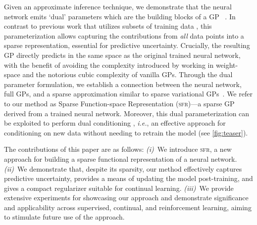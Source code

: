 \documentclass{article}
\makeatletter
\newcommand{\ie}{\textit{i.e.\@}\xspace}
\newcommand{\our}{\textsc{sfr}\xspace}
\makeatother
\begin{document}
Given an approximate inference technique, we demonstrate that the neural network emits `dual' parameters which are the building blocks of a GP~\cite{csato2002sparse, adam2021dual, chang2020fast} . In contrast to previous work that utilizes subsets of training data \cite{immer2021scalable},
this parameterization allows capturing the contributions from {\em all} data points into a sparse representation, essential for predictive uncertainty. Crucially, the resulting GP directly predicts in the same space as the original trained neural network, with the benefit of avoiding the complexity introduced by working in weight-space and the notorious cubic complexity of vanilla GPs.
Through the dual parameter formulation, we establish a connection between the neural network, full GPs, and a sparse approximation similar to sparse variational GPs~\cite{titsias2009variational}. We refer to our method as Sparse Function-space Representation (\our)---a sparse GP derived from a trained neural network. Moreover, this dual parameterization can be exploited to perform dual conditioning \citep{chang2022fantasizing}, \ie, an effective approach for conditioning on new data without needing to retrain the model (see \cref{fig:teaser}).



The contributions of this paper are as follows:
%
{\em (i)}~We introduce \our, a new approach for building a sparse functional representation of a neural network.
{\em (ii)}~We demonstrate that, despite its sparsity, our method effectively captures predictive uncertainty, provides a means of updating the model post-training, and gives a compact regularizer suitable for continual learning.
{\em (iii)}~We provide extensive experiments for showcasing our approach and demonstrate significance and applicability across supervised, continual, and reinforcement learning, aiming to stimulate future use of the approach.
\end{document}
